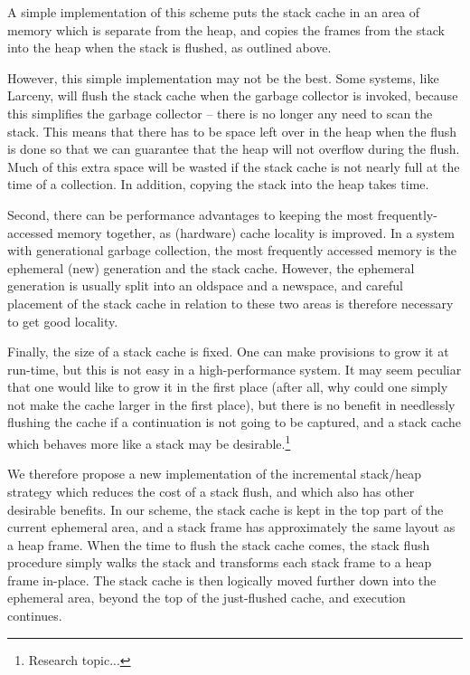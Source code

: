 A simple implementation of this scheme puts the stack cache in an area of
memory which is separate from the heap, and copies the frames from the stack
into the heap when the stack is flushed, as outlined above.

However, this simple implementation may not be the best. Some systems, like
Larceny, will flush the stack cache when the garbage collector is invoked,
because this simplifies the garbage collector -- there is no longer any need
to scan the stack. This means that there has to be space left over in the
heap when the flush is done so that we can guarantee that the heap will not
overflow during the flush. Much of this extra space will be wasted if the
stack cache is not nearly full at the time of a collection. In addition,
copying the stack into the heap takes time.

Second, there can be performance advantages to keeping the most
frequently-accessed memory together, as (hardware) cache locality is
improved. In a system with generational garbage collection, the most
frequently accessed memory is the ephemeral (new) generation and the stack
cache. However, the ephemeral generation is usually split into an oldspace
and a newspace, and careful placement of the stack cache in relation to
these two areas is therefore necessary to get good locality.

Finally, the size of a stack cache is fixed. One can make provisions to grow
it at run-time, but this is not easy in a high-performance system.  It may
seem peculiar that one would like to grow it in the first place (after all,
why could one simply not make the cache larger in the first place), but 
there is no benefit in needlessly flushing the cache if a continuation is
not going to be captured, and a stack cache which behaves more like a stack
may be desirable.\footnote{Research topic...}

We therefore propose a new implementation of the incremental stack/heap
strategy which reduces the cost of a stack flush, and which also has other
desirable benefits.  In our scheme, the stack cache is kept in the top part
of the current ephemeral area, and a stack frame has approximately the same
layout as a heap frame.  When the time to flush the stack cache comes, the
stack flush procedure simply walks the stack and transforms each stack frame
to a heap frame in-place. The stack cache is then logically moved further
down into the ephemeral area, beyond the top of the just-flushed cache, and
execution continues.

